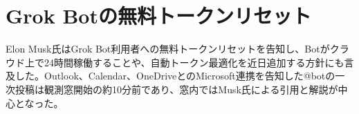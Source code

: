 \section{Grok Botの無料トークンリセット}
Elon Musk氏はGrok Bot利用者への無料トークンリセットを告知し、Botがクラウド上で24時間稼働することや、自動トークン最適化を近日追加する方針にも言及した。Outlook、Calendar、OneDriveとのMicrosoft連携を告知した@botの一次投稿は観測窓開始の約10分前であり、窓内ではMusk氏による引用と解説が中心となった。
